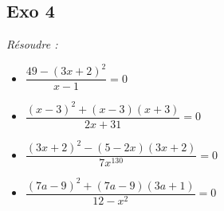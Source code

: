 \documentclass[10pt]{article}
\begin{document}
\subsection*{Exo 4}
\textit{Résoudre : }

\begin{multicols}{2}
\begin{itemize}[label=$\Diamond$]
\item $\dfrac{49 - (3x+ 2)^{2}}{x-1} = 0$
\item $\dfrac{(x - 3)^{2} + (x - 3)(x + 3)}{2x + 31} = 0$
\item $\dfrac{(3x + 2)^{2} - (5 - 2x)(3x+ 2)}{7x^{130}} = 0$
\item $\dfrac{(7a - 9)^{2} + (7a - 9)(3a + 1)}{12 - x^{2}} = 0$
\end{itemize}
\end{multicols}
\end{document}
